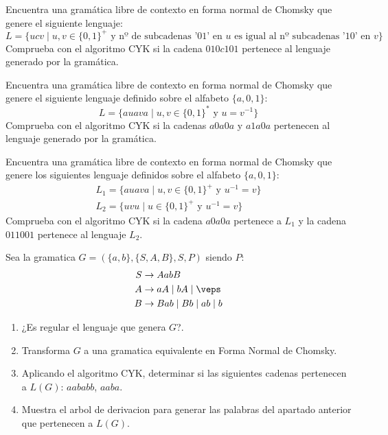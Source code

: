 \begin{ejercicio}\label{ej:1.6.11}
    Encuentra una gramática libre de contexto en forma normal de Chomsky que genere el siguiente lenguaje:
    \begin{equation*}
        L = \{ucv \mid u,v\in {\{0,1\}}^{+} \text{\ y nº de subcadenas '} 01 \text{' en\ } u \text{\ es igual al nº subcadenas '}10 \text{' en\ }v\}
    \end{equation*}
    Comprueba con el algoritmo CYK si la cadena $010c101$ pertenece al lenguaje generado por la gramática.
\end{ejercicio}

\begin{ejercicio}\label{ej:1.6.12}
    Encuentra una gramática libre de contexto en forma normal de Chomsky que genere el siguiente lenguaje definido sobre el alfabeto $\{a,0,1\}$:
    \begin{equation*}
        L = \{auava \mid u,v\in {\{0,1\}}^{\ast} \text{\ y\ } u=v^{-1}\}
    \end{equation*}
    Comprueba con el algoritmo CYK si la cadenas $a0a0a$ y $a1a0a$ pertenecen al lenguaje generado por la gramática.
\end{ejercicio}

\begin{ejercicio}\label{ej:1.6.13}
    Encuentra una gramática libre de contexto en forma normal de Chomsky que genere los siguientes lenguaje definidos sobre el alfabeto $\{a,0,1\}$:
    \begin{gather*}
        L_1 = \{auava \mid u,v \in {\{0,1\}}^{+} \text{\ y\ } u^{-1} = v\} \\
        L_2 = \{uvu \mid u\in {\{0,1\}}^{+}\text{\ y\ } u^{-1} = v\}
    \end{gather*}
    Comprueba con el algoritmo CYK si la cadena $a0a0a$ pertenece a $L_1$ y la cadena $011001$ pertenece al lenguaje $L_2$.
\end{ejercicio}

\begin{ejercicio}\label{ej:1.6.14}
    Sea la gramatica $G = (\{a,b\},\{S,A,B\},S,P)$ siendo $P$:
    \begin{align*}
        S&\rightarrow AabB \\
        A &\rightarrow aA \mid bA \mid \veps \\
        B&\rightarrow Bab \mid Bb \mid ab \mid b
    \end{align*}
    \begin{enumerate}
        \item ¿Es regular el lenguaje que genera $G$?.
        \item Transforma $G$ a una gramatica equivalente en Forma Normal de Chomsky.
        \item Aplicando el algoritmo CYK, determinar si las siguientes cadenas pertenecen a $L(G)$: $aababb$, $aaba$.
        \item Muestra el arbol de derivacion para generar las palabras del apartado anterior que pertenecen a $L(G)$.
    \end{enumerate}
\end{ejercicio}

